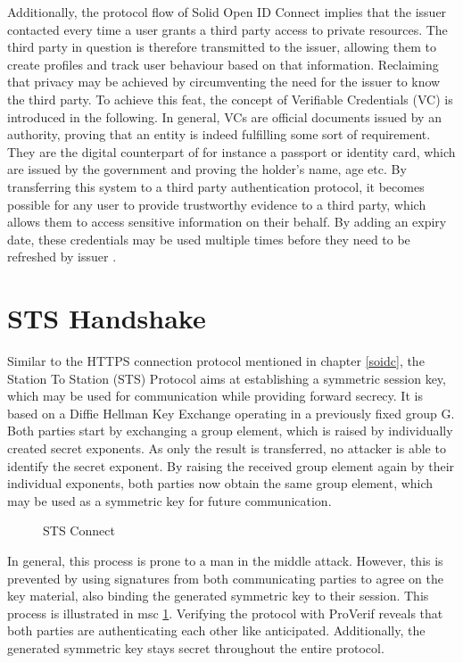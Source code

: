 \documentclass[11pt,twoside,a4paper,openright]{book}
\begin{document}
Additionally, the protocol flow of Solid Open ID Connect implies that the issuer contacted every time a user grants a third party access to private resources. The third party in question is therefore transmitted to the issuer, allowing them to create profiles and track user behaviour based on that information. Reclaiming that privacy may be achieved by circumventing the need for the issuer to know the third party. To achieve this feat, the concept of Verifiable Credentials (VC) is introduced in the following. In general, VCs are official documents issued by an authority, proving that an entity is indeed fulfilling some sort of requirement. They are the digital counterpart of for instance a passport or identity card, which are issued by the government and proving the holder's name, age etc. By transferring this system to a third party authentication protocol, it becomes possible for any user to provide trustworthy evidence to a third party, which allows them to access sensitive information on their behalf. By adding an expiry date, these credentials may be used multiple times before they need to be refreshed by issuer \cite{credentials}.


\section{STS Handshake}

Similar to the HTTPS connection protocol mentioned in chapter \ref{soidc}, the Station To Station (STS) Protocol \cite{o1987encryption} aims at establishing a symmetric session key, which may be used for communication while providing forward secrecy. It is based on a Diffie Hellman Key Exchange operating in a previously fixed group G. Both parties start by exchanging a group element, which is raised by individually created secret exponents. As only the result is transferred, no attacker is able to identify the secret exponent. By raising the received group element again by their individual exponents, both parties now obtain the same group element, which may be used as a symmetric key for future communication. 

\begin{figure}[H]
    \centering
    
    \caption{STS Connect}
    \label{fig:msc_sts}
\end{figure}

In general, this process is prone to a man in the middle attack. However, this is prevented by using signatures from both communicating parties to agree on the key material, also binding the generated symmetric key to their session. This process is illustrated in msc \ref{fig:msc_sts}. Verifying the protocol with ProVerif reveals that both parties are authenticating each other like anticipated. Additionally, the generated symmetric key stays secret throughout the entire protocol. 
\end{document}
